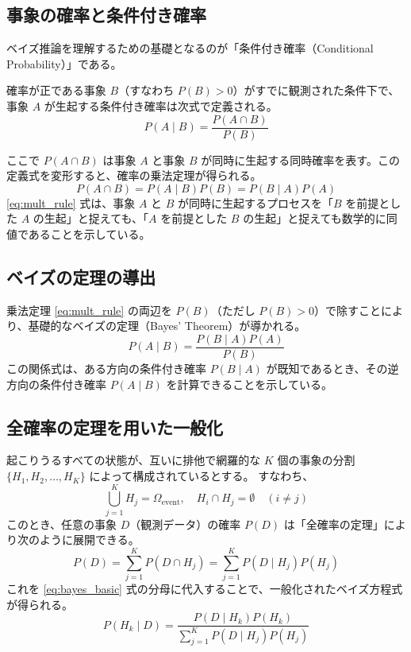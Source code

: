 \subsection{事象の確率と条件付き確率}
ベイズ推論を理解するための基礎となるのが「条件付き確率（Conditional Probability）」である。

確率が正である事象 $B$（すなわち $P(B) > 0$）がすでに観測された条件下で、事象 $A$ が生起する条件付き確率は次式で定義される。
\begin{equation}
P(A \mid B) = \frac{P(A \cap B)}{P(B)}
\label{eq:cond_prob}
\end{equation}

ここで $P(A \cap B)$ は事象 $A$ と事象 $B$ が同時に生起する同時確率を表す。この定義式を変形すると、確率の乗法定理が得られる。
\begin{equation}
P(A \cap B) = P(A \mid B) P(B) = P(B \mid A) P(A)
\label{eq:mult_rule}
\end{equation}
\eqref{eq:mult_rule} 式は、事象 $A$ と $B$ が同時に生起するプロセスを「$B$ を前提とした $A$ の生起」と捉えても、「$A$ を前提とした $B$ の生起」と捉えても数学的に同値であることを示している。

\subsection{ベイズの定理の導出}
乗法定理 \eqref{eq:mult_rule} の両辺を $P(B)$（ただし $P(B) > 0$）で除すことにより、基礎的なベイズの定理（Bayes' Theorem）が導かれる。
\begin{equation}
P(A \mid B) = \frac{P(B \mid A) P(A)}{P(B)}
\label{eq:bayes_basic}
\end{equation}
この関係式は、ある方向の条件付き確率 $P(B \mid A)$ が既知であるとき、その逆方向の条件付き確率 $P(A \mid B)$ を計算できることを示している。

\subsection{全確率の定理を用いた一般化}
起こりうるすべての状態が、互いに排他で網羅的な $K$ 個の事象の分割 $\{H_1, H_2, \dots, H_K\}$ によって構成されているとする。
すなわち、
\begin{equation}
    \bigcup_{j=1}^K H_j = \Omega_{\mathrm{event}}, \quad H_i \cap H_j = \emptyset \quad (i \neq j)
\end{equation}
このとき、任意の事象 $D$（観測データ）の確率 $P(D)$ は「全確率の定理」により次のように展開できる。
\begin{equation}
P(D) = \sum_{j=1}^K P(D \cap H_j) = \sum_{j=1}^K P(D \mid H_j) P(H_j)
\label{eq:law_of_total_prob}
\end{equation}
これを \eqref{eq:bayes_basic} 式の分母に代入することで、一般化されたベイズ方程式が得られる。
\begin{equation}
P(H_k \mid D) = \frac{P(D \mid H_k) P(H_k)}{\displaystyle\sum_{j=1}^K P(D \mid H_j) P(H_j)}
\label{eq:gen_bayes}
\end{equation}

